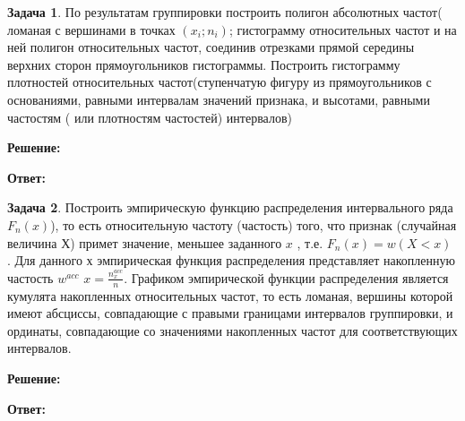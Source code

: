 \documentclass[a4paper,12pt]{article}
\theoremstyle{definition}
\newtheorem{problem}{Задача}
\newenvironment{solution}
{\begin{shaded}\textbf{Решение:}\par}
{\end{shaded}}
\newenvironment{answer}
{\par\noindent\textbf{Ответ:} \color{blue}}
{\par}
\begin{document}
\vspace{8pt}
\begin{problem}
    По результатам группировки построить полигон абсолютных частот( ломаная с
    вершинами в точках \((x_i; n_i)\); гистограмму относительных частот и на ней полигон
    относительных частот, соединив отрезками прямой середины верхних сторон
    прямоугольников гистограммы.
    Построить гистограмму плотностей относительных частот(ступенчатую фигуру
    из прямоугольников с основаниями, равными интервалам значений признака, и
    высотами, равными частостям ( или плотностям частостей) интервалов)
    
        \begin{solution}
        \end{solution}
    
        \begin{answer}
        \end{answer}
    
    \end{problem}



\vspace{8pt}
\begin{problem}
    Построить эмпирическую функцию распределения интервального ряда \(F_n(x)\)), то
    есть относительную частоту (частость) того, что признак (случайная величина \(Х\)) 
    примет значение, меньшее заданного \(x\) , т.е. \(F_n(x) = w(X < x)\) . Для данного \(х\)
    эмпирическая функция распределения представляет накопленную частость \(w^{acc}\) 
    \(x = \frac{n^{acc}_x}{n}\).
    Графиком эмпирической функции распределения является кумулята накопленных
    относительных частот, то есть ломаная, вершины которой имеют абсциссы,
    совпадающие с правыми границами интервалов группировки, и ординаты,
    совпадающие со значениями накопленных частот для соответствующих
    интервалов.
    
        \begin{solution}
        \end{solution}
    
        \begin{answer}
        \end{answer}
    
    \end{problem}
\end{document}

